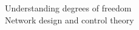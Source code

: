 \documentclass[preview]{standalone}
\begin{document}
Understanding degrees of freedom\\Network design and control theory\\
\end{document}
